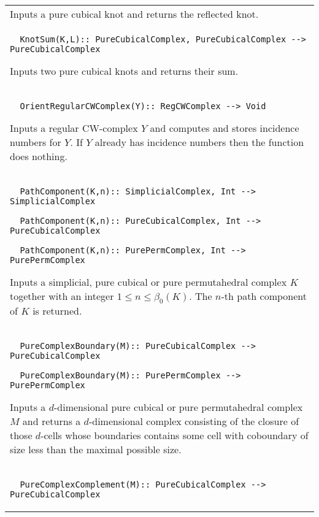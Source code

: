 \documentclass[a4paper,11pt]{report}
\begin{document}
{\begin{center}
\begin{tabular}{|l|}
 

 Inputs a pure cubical knot and returns the reflected knot. \\
 \index{KnotSum} 
\begin{verbatim}  KnotSum(K,L):: PureCubicalComplex, PureCubicalComplex --> PureCubicalComplex
\end{verbatim}


 

 Inputs two pure cubical knots and returns their sum. \\
 \index{OrientRegularCWComplex} 
\begin{verbatim}  OrientRegularCWComplex(Y):: RegCWComplex --> Void
\end{verbatim}


 

 Inputs a regular CW-complex $Y$ and computes and stores incidence numbers for $Y$. If $Y$ already has incidence numbers then the function does nothing. \\
 \index{PathComponent} 
\begin{verbatim}  PathComponent(K,n):: SimplicialComplex, Int --> SimplicialComplex
\end{verbatim}
 
\begin{verbatim}  PathComponent(K,n):: PureCubicalComplex, Int --> PureCubicalComplex
\end{verbatim}
 
\begin{verbatim}  PathComponent(K,n):: PurePermComplex, Int --> PurePermComplex
\end{verbatim}


 

Inputs a simplicial, pure cubical or pure permutahedral complex $K$ together with an integer $1 \le n \le \beta_0(K)$. The $n$-th path component of $K$ is returned. \\
 \index{PureComplexBoundary} 
\begin{verbatim}  PureComplexBoundary(M):: PureCubicalComplex --> PureCubicalComplex
\end{verbatim}
 
\begin{verbatim}  PureComplexBoundary(M):: PurePermComplex --> PurePermComplex
\end{verbatim}


 

 Inputs a $d$-dimensional pure cubical or pure permutahedral complex $M$ and returns a $d$-dimensional complex consisting of the closure of those $d$-cells whose boundaries contains some cell with coboundary of size less than
the maximal possible size. \\
 \index{PureComplexComplement} 
\begin{verbatim}  PureComplexComplement(M):: PureCubicalComplex --> PureCubicalComplex
\end{verbatim}
 

\end{tabular}
\end{center}}
\end{document}

